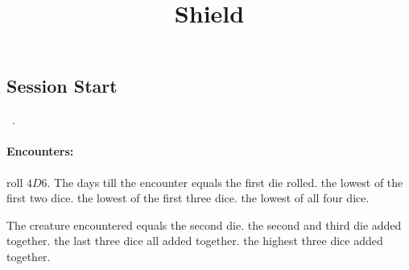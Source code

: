 \documentclass[a4paper,openany]{book}
\title{\Glsentrytext{gm} Shield}
\begin{document}


\cleardoublepage

\begin{figure*}[b!]
  \stackingDamageChart
\end{figure*}

\begin{multicols}{2}

\subsection*{Session Start}



\orrery

\noindent
\showCycle~\cycleDesc.

\paragraph{Encounters:}
roll $4D6$.
The days till the encounter equals the
\ifcase\value{temperature}%
  first die rolled. 
\or%
  the lowest of the first two dice.
\or%
  the lowest of the first three dice.
\or%
  the lowest of all four dice.
\fi

The creature encountered equals
\ifcase\value{temperature}%
  the second die.
\or%
  the second and third die added together.
\or%
  the last three dice all added together.
\else%
  the highest three dice added together.
\fi%

\ifcase\value{temperature}%
  \setcounter{enc}{13}
  \setcounter{diceNo}{7}
  \begin{boxtable}[L|r|Lc]
    \hline
  \end{boxtable}
\or%
  \setcounter{enc}{13}
  \begin{boxtable}[L|r|Lc]
  \end{boxtable}
  \setcounter{diceNo}{5}
\else%
  \allEncounterTables%
\fi


\end{multicols}
\end{document}

